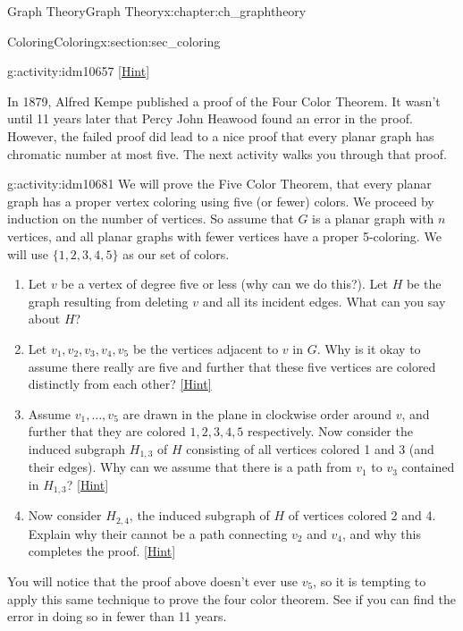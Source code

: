 \documentclass[oneside,10pt,]{book}
\numberwithin{equation}{chapter}
\begin{document}
\begin{chapterptx}{Graph Theory}{}{Graph Theory}{}{}{x:chapter:ch_graphtheory}
\begin{sectionptx}{Coloring}{}{Coloring}{}{}{x:section:sec_coloring}
\begin{introduction}{}
\begin{activity}{}{g:activity:idm10657}
\space\hspace*{0pt}\hfill{\tiny\hyperlink{g:hint:idm10660-back}{[Hint]}}\end{activity}
In 1879, Alfred Kempe published a proof of the Four Color Theorem.  It wasn't until 11 years later that Percy John Heawood found an error in the proof.  However, the failed proof did lead to a nice proof that every planar graph has chromatic number at most five.  The next activity walks you through that proof.%
\begin{activity}{}{g:activity:idm10681}%
We will prove the Five Color Theorem, that every planar graph has a proper vertex coloring using five (or fewer) colors.  We proceed by induction on the number of vertices.  So assume that \(G\) is a planar graph with \(n\) vertices, and all planar graphs with fewer vertices have a proper 5-coloring.  We will use \(\{1,2,3,4,5\}\) as our set of colors.%
\begin{enumerate}[font=\bfseries,label=(\alph*),ref=\alph*]
\item{}Let \(v\) be a vertex of degree five or less (why can we do this?).  Let \(H\) be the graph resulting from deleting \(v\) and all its incident edges.  What can you say about \(H\)?%
\item{}Let \(v_1, v_2, v_3, v_4, v_5\) be the vertices adjacent to \(v\) in \(G\).  Why is it okay to assume there really are five and further that these five vertices are colored distinctly from each other?%
\space\hspace*{0pt}\hfill{\tiny\hyperlink{g:hint:idm10700-back}{[Hint]}}\item{}Assume \(v_1, \ldots, v_5\) are drawn in the plane in clockwise order around \(v\), and further that they are colored \(1,2,3,4,5\) respectively.  Now consider the induced subgraph \(H_{1,3}\) of \(H\) consisting of all vertices colored 1 and 3 (and their edges).  Why can we assume that there is a path from \(v_1\) to \(v_3\) contained in \(H_{1,3}\)?%
\space\hspace*{0pt}\hfill{\tiny\hyperlink{g:hint:idm10714-back}{[Hint]}}\item{}Now consider \(H_{2,4}\), the induced subgraph of \(H\) of vertices colored 2 and 4.  Explain why their cannot be a path connecting \(v_2\) and \(v_4\), and why this completes the proof.%
\space\hspace*{0pt}\hfill{\tiny\hyperlink{g:hint:idm10726-back}{[Hint]}}\end{enumerate}
\end{activity}
You will notice that the proof above doesn't ever use \(v_5\), so it is tempting to apply this same technique to prove the four color theorem.  See if you can find the error in doing so in fewer than 11 years.%

\end{introduction}
\end{sectionptx}
\end{chapterptx}
\end{document}
